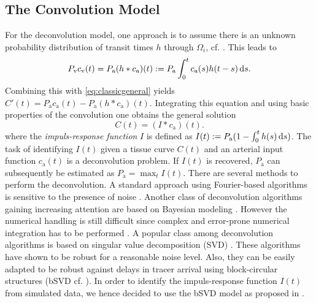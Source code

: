 \documentclass[journal,twocolumn]{IEEEtran}
\newcommand{\ca}{c_\mathrm{a}}
\newcommand{\cout}{c_{\mathrm{v}}}
\newcommand{\Pa}{P_{\mathrm{a}}}
\newcommand{\Pout}{P_{\mathrm{v}}}
\begin{document}
	

	\subsection{The Convolution Model}\label{sec:conv}
	For the deconvolution model, one approach is to assume there is an unknown probability distribution of transit times $h$ through $\Omega_i$, cf. \cite{sourbron13}. 
	This leads to
	\begin{equation}
		\Pout\cout(t) = \Pa(h*\ca)(t) := \Pa\int_0^t \ca(s) h(t-s) \diffint s.
	\end{equation}
	Combining this with \eqref{eq:classicgeneral} yields $C'(t) = \Pa\ca(t)-\Pa (h*\ca)(t)$.
	Integrating this equation and using basic properties of the convolution one obtains the general solution
	\begin{equation}
		C(t) = (I*\ca)(t).
		\label{eq:conv}
	\end{equation}
	where the \emph{impuls-response function} $I$ is defined as $I(t) := \Pa(1-\int_0^t h(s) \diffint s)$.
	The task of identifying $I(t)$ given a tissue curve $C(t)$ and an arterial input function $\ca(t)$ is a deconvolution problem.
	If $I(t)$ is recovered, $\Pa$ can subsequently be estimated as $\Pa = \max_{t} I(t)$.
	There are several methods to perform the deconvolution.
	A standard approach using Fourier-based algorithms is sensitive to the presence of noise \cite{ostergaard96}.
	Another class of deconvolution algorithms gaining increasing attention are based on Bayesian modeling \cite{boutelier12}.
	However the numerical handling is still difficult since complex and error-prone numerical integration has to be performed \cite{boutelier12}.
	A popular class among deconvolution algorithms is based on singular value decomposition (SVD) \cite{ostergaard96}.
	These algorithms have shown to be robust for a reasonable noise level.
	Also, they can be easily adapted to be robust against delays in tracer arrival using block-circular structures (bSVD cf. \cite{wu03}).
	In order to identify the impuls-response function $I(t)$ from simulated data, we hence decided to use the bSVD model as proposed in \cite{wu03}.
	
	
	
\end{document}
